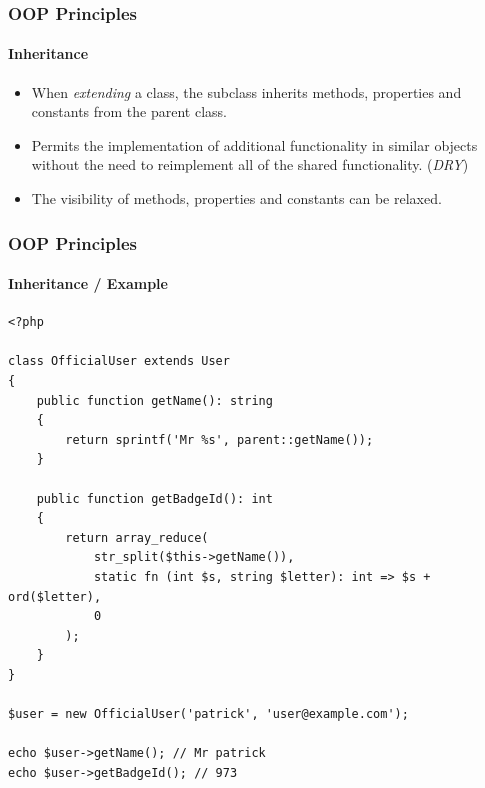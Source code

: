 \begin{frame}
    \frametitle{OOP Principles}
    \framesubtitle{Inheritance}

    \begin{itemize}[<+->]
        \item When \textit{extending} a class, the subclass inherits methods, properties and constants from the parent class.
        \item Permits the implementation of additional functionality in similar objects without the need to reimplement all of the shared functionality. (\textit{DRY})
        \item The visibility of methods, properties and constants can be relaxed.
    \end{itemize}
\end{frame}

\begin{frame}[fragile,c]
    \frametitle{OOP Principles}
    \framesubtitle{Inheritance / Example}

    \begin{lstlisting}
<?php

class OfficialUser extends User
{
    public function getName(): string
    {
        return sprintf('Mr %s', parent::getName());
    }

    public function getBadgeId(): int
    {
        return array_reduce(
            str_split($this->getName()),
            static fn (int $s, string $letter): int => $s + ord($letter),
            0
        );
    }
}

$user = new OfficialUser('patrick', 'user@example.com');

echo $user->getName(); // Mr patrick
echo $user->getBadgeId(); // 973
    \end{lstlisting}
\end{frame}

